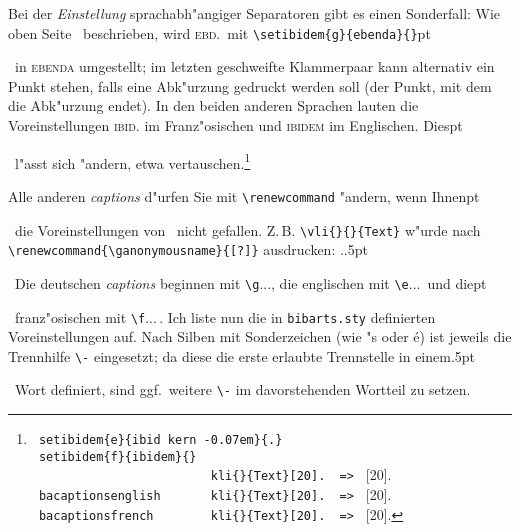 \documentclass[12pt,a4paper]{article}
\newcommand{\pdfko}[1]{\kern #1pt
                          \strut\ignorespaces}%
\newcommand{\pbs}{\string\ \unskip}
\newcommand{\bs}{\protect\pbs}
\begin{document}

\vspace{1.325ex}\noindent
Bei der \textit{Einstellung} sprachabh"angiger Separatoren gibt es einen
Sonderfall: Wie oben Seite~\pageref{setibidem}
beschrieben, wird \textsc{ebd.}\ mit \verb|\setibidem{g}{ebenda}{}|\pdfko{1}\ 
in \textsc{ebenda} umgestellt; im letzten geschweifte Klammerpaar
kann alternativ ein Punkt stehen, falls eine Abk"urzung gedruckt werden
soll (der Punkt, mit dem die Abk"urzung endet). In den beiden anderen
Sprachen lauten die Voreinstellungen \textsc{ibid.} im Franz"osischen
und \textsc{ibidem} im Englischen. Dies\pdfko{1}\  
l"asst sich "andern, etwa vertauschen.\footnote{
\texttt{\bs setibidem\{e\}\{ibid\bs kern -0.07em\}\{.\}}  \\
\hspace*{5.5mm} \texttt{\bs setibidem\{f\}\{ibidem\}\{\}}  \\
\hspace*{5.5mm} \texttt{\ \ \ \ \ \ \ \ \ \ \ \ \ \ \ \ \ \ \ \ \ \ \ \ \bs kli\{\}\{Text\}[20]. \ => } \bacaptionsgerman {}[20]. \\
\hspace*{5.5mm} \texttt{\bs bacaptionsenglish \ \ \ \ \ \bs kli\{\}\{Text\}[20]. \ => } \bacaptionsenglish {}[20]. \\
\hspace*{5.5mm} \texttt{\bs bacaptionsfrench \ \ \ \ \ \ \bs kli\{\}\{Text\}[20]. \ => } \bacaptionsfrench \printonlykli{}{Text}[20].}

\vspace{1ex}\noindent
Alle anderen \textit{captions} d"urfen Sie mit \verb|\renewcommand| "andern, 
wenn Ihnen\pdfko{1}\ 
die Voreinstellungen von \BibArts\ nicht gefallen. Z.\,B.
\verb|\vli{}{}{Text}| w"urde nach \verb|\renewcommand{\ganonymousname}{[?]}| 
ausdrucken: {\renewcommand{\ganonymousname}{[?]} }.\pdfko{.5}\
Die deutschen \textit{captions} beginnen mit \verb|\g|..., die englischen mit 
\verb|\e|...\ und die\pdfko{1}\ 
franz"osischen mit \verb|\f|...\,. Ich liste nun die 
in \verb|bibarts.sty| definierten Voreinstellungen auf. Nach Silben mit 
Sonderzeichen (wie "s oder \'e) ist jeweils die Trennhilfe \verb|\-| 
eingesetzt; da diese die erste erlaubte Trennstelle in einem\pdfko{.5}\ 
Wort definiert, 
sind ggf.\ weitere \verb|\-| im davorstehenden Wortteil zu setzen. 
\end{document}
